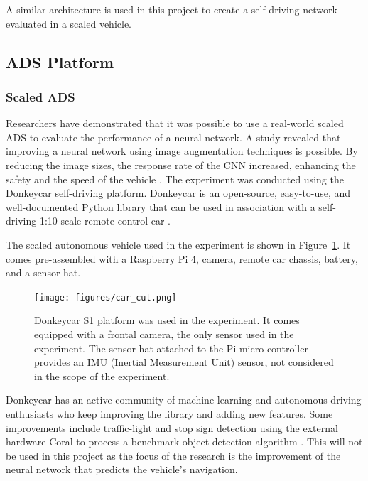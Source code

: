 \documentclass[12pt]{article}
\begin{document}
A similar architecture is used in this project to create a self-driving network evaluated in a scaled vehicle.

\subsection{ADS Platform} 

\subsubsection{Scaled ADS}

Researchers have demonstrated that it was possible to use a real-world scaled ADS to evaluate the performance of a neural network. A study revealed that improving a neural network using image augmentation techniques is possible. By reducing the image sizes, the response rate of the CNN increased, enhancing the safety and the speed of the vehicle \parencite{Mahmoud} . The experiment was conducted using the Donkeycar self-driving platform. Donkeycar is an open-source, easy-to-use, and well-documented Python library that can be used in association with a self-driving 1:10 scale remote control car \parencite{donkey} . 

The scaled autonomous vehicle used in the experiment is shown in Figure~\ref{fig:donkeycar}. It comes pre-assembled with a Raspberry Pi 4, camera, remote car chassis, battery, and a sensor hat.

\begin{figure} [!ht] %
\begin{center}
\texttt{[image: figures/car\_cut.png]}
\caption{ Donkeycar S1 platform was used in the experiment. It comes equipped with a frontal camera, the only sensor used in the experiment. The sensor hat attached to the Pi micro-controller provides an IMU (Inertial Measurement Unit) sensor, not considered in the scope of the experiment.}
\label{fig:donkeycar}
\end{center}
\end{figure}

Donkeycar has an active community of machine learning and autonomous driving enthusiasts who keep improving the library and adding new features. Some improvements include traffic-light and stop sign detection using the external hardware Coral to process a benchmark object detection algorithm \parencite{coral}. This will not be used in this project as the focus of the research is the improvement of the neural network that predicts the vehicle's navigation. 
\end{document}

